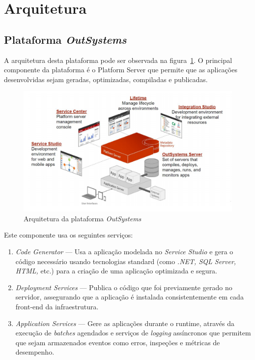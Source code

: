 \newpage

\section{Arquitetura}\label{sec:arquitechture}

\subsection{Plataforma \textit{OutSystems}}\label{sec:OutSystemsArch}

A arquitetura desta plataforma pode ser observada na figura~\ref{fig:outsystemsArch}. 
O principal componente da plataforma é o Platform Server que permite que as aplicações 
desenvolvidas sejam geradas, optimizadas, compiladas e publicadas. 

\begin{figure}[H]
  \centering
  \includegraphics[]{figures/Architecture.png}
  \caption{Arquitetura da plataforma \textit{OutSystems~\cite{outsystems}}}\label{fig:outsystemsArch}
\end{figure}

Este componente usa os seguintes serviços: 
\begin{enumerate}
  \item \textit{Code Generator} --- Usa a aplicação modelada no \textit{Service Studio} e gera o código necessário usando tecnologias standard (como \textit{.NET, SQL Server, HTML,} etc.) para a criação de uma aplicação optimizada e segura.
  \item \textit{Deployment Services} --- Publica o código que foi previamente gerado no servidor, assegurando que a aplicação é instalada consistentemente em cada front-end da infraestrutura.
  \item \textit{Application Services} --- Gere as aplicações durante o runtime, através da execução de \textit{batches} agendados e serviços de \textit{logging} assíncronos que permitem que sejam armazenados eventos como erros, inspeções e métricas de desempenho.
\end{enumerate}

